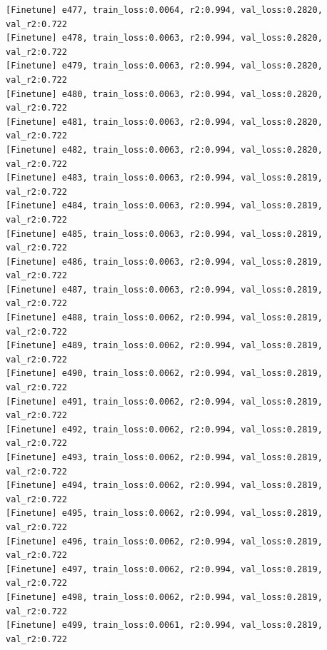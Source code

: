 \documentclass[a4paper, 12pt]{article}
\begin{document}
\begin{lstlisting}
[Finetune] e477, train_loss:0.0064, r2:0.994, val_loss:0.2820, val_r2:0.722
[Finetune] e478, train_loss:0.0063, r2:0.994, val_loss:0.2820, val_r2:0.722
[Finetune] e479, train_loss:0.0063, r2:0.994, val_loss:0.2820, val_r2:0.722
[Finetune] e480, train_loss:0.0063, r2:0.994, val_loss:0.2820, val_r2:0.722
[Finetune] e481, train_loss:0.0063, r2:0.994, val_loss:0.2820, val_r2:0.722
[Finetune] e482, train_loss:0.0063, r2:0.994, val_loss:0.2820, val_r2:0.722
[Finetune] e483, train_loss:0.0063, r2:0.994, val_loss:0.2819, val_r2:0.722
[Finetune] e484, train_loss:0.0063, r2:0.994, val_loss:0.2819, val_r2:0.722
[Finetune] e485, train_loss:0.0063, r2:0.994, val_loss:0.2819, val_r2:0.722
[Finetune] e486, train_loss:0.0063, r2:0.994, val_loss:0.2819, val_r2:0.722
[Finetune] e487, train_loss:0.0063, r2:0.994, val_loss:0.2819, val_r2:0.722
[Finetune] e488, train_loss:0.0062, r2:0.994, val_loss:0.2819, val_r2:0.722
[Finetune] e489, train_loss:0.0062, r2:0.994, val_loss:0.2819, val_r2:0.722
[Finetune] e490, train_loss:0.0062, r2:0.994, val_loss:0.2819, val_r2:0.722
[Finetune] e491, train_loss:0.0062, r2:0.994, val_loss:0.2819, val_r2:0.722
[Finetune] e492, train_loss:0.0062, r2:0.994, val_loss:0.2819, val_r2:0.722
[Finetune] e493, train_loss:0.0062, r2:0.994, val_loss:0.2819, val_r2:0.722
[Finetune] e494, train_loss:0.0062, r2:0.994, val_loss:0.2819, val_r2:0.722
[Finetune] e495, train_loss:0.0062, r2:0.994, val_loss:0.2819, val_r2:0.722
[Finetune] e496, train_loss:0.0062, r2:0.994, val_loss:0.2819, val_r2:0.722
[Finetune] e497, train_loss:0.0062, r2:0.994, val_loss:0.2819, val_r2:0.722
[Finetune] e498, train_loss:0.0062, r2:0.994, val_loss:0.2819, val_r2:0.722
[Finetune] e499, train_loss:0.0061, r2:0.994, val_loss:0.2819, val_r2:0.722

\end{lstlisting}	
\end{document}
